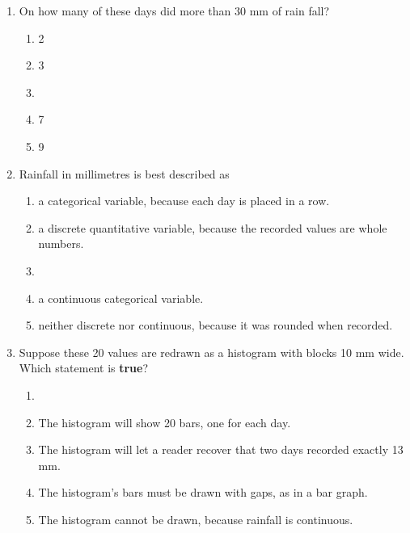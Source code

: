 \documentclass[12pt]{article}
\begin{document}
\vspace{0.10in}

\begin{enumerate}[leftmargin=1.9em, itemsep=0.13in]

  \item On how many of these days did more than 30 mm of rain fall?
        \begin{enumerate}[label=\textbf{(\Alph*)}, leftmargin=2.2em, itemsep=2pt]
          \item 2
          \item 3
          \item {}
          \item 7
          \item 9
                \hfill{}
        \end{enumerate}

  \item Rainfall in millimetres is best described as
        \begin{enumerate}[label=\textbf{(\Alph*)}, leftmargin=2.2em, itemsep=2pt]
          \item a categorical variable, because each day is placed in a row.
          \item a discrete quantitative variable, because the recorded values are whole numbers.
          \item {}
          \item a continuous categorical variable.
          \item neither discrete nor continuous, because it was rounded when recorded.
                \hfill{}
        \end{enumerate}

  \item Suppose these 20 values are redrawn as a histogram with blocks 10 mm wide. Which
        statement is \textbf{true}?
        \begin{enumerate}[label=\textbf{(\Alph*)}, leftmargin=2.2em, itemsep=2pt]
          \item {}
          \item The histogram will show 20 bars, one for each day.
          \item The histogram will let a reader recover that two days recorded exactly 13 mm.
          \item The histogram's bars must be drawn with gaps, as in a bar graph.
          \item The histogram cannot be drawn, because rainfall is continuous.
                \hfill{}
        \end{enumerate}


\end{enumerate}
\end{document}
